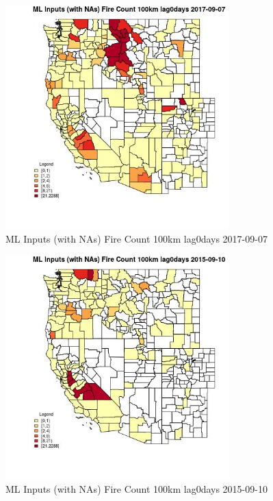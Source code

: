 \begin{figure} 
\centering  
\includegraphics[width=0.77\textwidth]{Code_Outputs/Report_ML_input_PM25_Step4_part_e_de_duplicated_aves_compiled_2019-05-21wNAs_CountyFire_Count_100km_lag0daysMean2017-09-07.jpg} 
\caption{\label{fig:Report_ML_input_PM25_Step4_part_e_de_duplicated_aves_compiled_2019-05-21wNAsCountyFire_Count_100km_lag0daysMean2017-09-07}ML Inputs (with NAs) Fire Count 100km lag0days 2017-09-07} 
\end{figure} 
 

\begin{figure} 
\centering  
\includegraphics[width=0.77\textwidth]{Code_Outputs/Report_ML_input_PM25_Step4_part_e_de_duplicated_aves_compiled_2019-05-21wNAs_CountyFire_Count_100km_lag0daysMean2015-09-10.jpg} 
\caption{\label{fig:Report_ML_input_PM25_Step4_part_e_de_duplicated_aves_compiled_2019-05-21wNAsCountyFire_Count_100km_lag0daysMean2015-09-10}ML Inputs (with NAs) Fire Count 100km lag0days 2015-09-10} 
\end{figure} 
 

